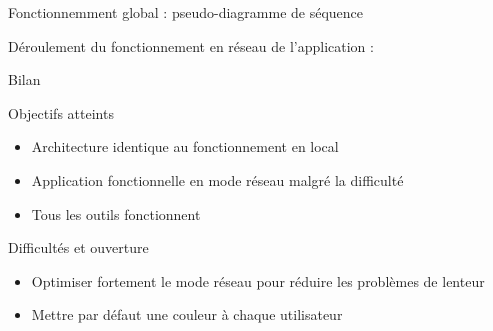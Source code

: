 \documentclass{beamer}
\begin{document}
            \begin{frame}{Fonctionnemment global : pseudo-diagramme de séquence}
            
            Déroulement du fonctionnement en réseau de l'application :
                  \begin{center}
                  \scalebox{0.5}{} 
                  \end{center}
            \end{frame}
            
            \begin{frame}{Bilan}
                  \begin{exampleblock}{Objectifs atteints}
                        \begin{itemize}
                        \item Architecture identique au fonctionnement en local
                        \item Application fonctionnelle en mode réseau malgré la difficulté
                        \item Tous les outils fonctionnent
                        \end{itemize}
                  \end{exampleblock}
                  \pause
                  \begin{alertblock}{Difficultés et ouverture}
                        \begin{itemize}
                        \item Optimiser fortement le mode réseau pour réduire les problèmes de lenteur
                        \item Mettre par défaut une couleur à chaque utilisateur
                        \end{itemize}
                  \end{alertblock}
            \end{frame}
\end{document}
